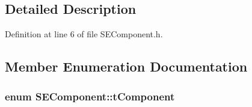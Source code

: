 \subsection{Detailed Description}


Definition at line 6 of file S\+E\+Component.\+h.



\subsection{Member Enumeration Documentation}
\subsubsection[{t\+Component}]{\setlength{\rightskip}{0pt plus 5cm}enum {\bf S\+E\+Component\+::t\+Component}}\label{class_s_e_component_a3df61ea419feacc6873d66be7268b707}
